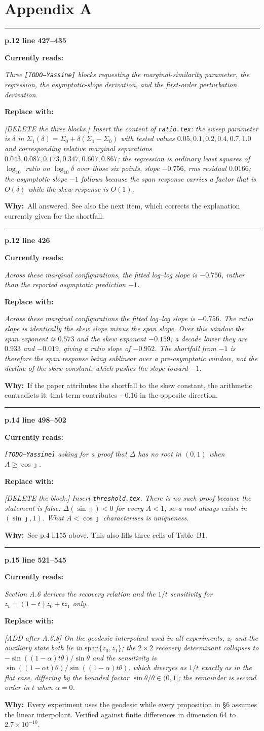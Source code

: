 \documentclass[11pt]{article}
\newcommand{\LOC}[2]{\medskip\noindent\textcolor{hd}{\rule{\textwidth}{0.6pt}}\par
  \noindent\textbf{\large p.#1 \quad line #2}\par\smallskip}
\newcommand{\WRONG}[1]{\noindent\textcolor{bad}{\textbf{Currently reads:}}\par
  \noindent\begingroup\itshape #1\endgroup\par\smallskip}
\newcommand{\RIGHT}[1]{\noindent\textcolor{good}{\textbf{Replace with:}}\par
  \noindent\begingroup\itshape #1\endgroup\par\smallskip}
\newcommand{\WHY}[1]{\noindent\textbf{Why:}\ #1\par}
\begin{document}
\section*{Appendix A}

\LOC{12}{427--435}
\WRONG{Three \texttt{[TODO---Yassine]} blocks requesting the marginal-similarity parameter, the
regression, the asymptotic-slope derivation, and the first-order perturbation derivation.}
\RIGHT{[DELETE the three blocks.] Insert the content of \texttt{ratio.tex}: the sweep parameter
is $\delta$ in $\Sigma_1(\delta)=\Sigma_0+\delta(\Sigma_1-\Sigma_0)$ with tested values
$0.05, 0.1, 0.2, 0.4, 0.7, 1.0$ and corresponding relative marginal separations
$0.043, 0.087, 0.173, 0.347, 0.607, 0.867$; the regression is ordinary least squares of
$\log_{10}$ ratio on $\log_{10}\delta$ over those six points, slope $-0.756$, rms residual
$0.0166$; the asymptotic slope $-1$ follows because the span response carries a factor that is
$O(\delta)$ while the skew response is $O(1)$.}
\WHY{All answered. See also the next item, which corrects the explanation currently given for the
shortfall.}

\LOC{12}{426}
\WRONG{Across these marginal configurations, the fitted log--log slope is $-0.756$, rather than
the reported asymptotic prediction $-1$.}
\RIGHT{Across these marginal configurations the fitted log--log slope is $-0.756$. The ratio
slope is identically the skew slope minus the span slope. Over this window the span exponent is
$0.573$ and the skew exponent $-0.159$; a decade lower they are $0.933$ and $-0.019$, giving a
ratio slope of $-0.952$. The shortfall from $-1$ is therefore the span response being sublinear
over a pre-asymptotic window, not the decline of the skew constant, which pushes the slope
\emph{toward} $-1$.}
\WHY{If the paper attributes the shortfall to the skew constant, the arithmetic contradicts it:
that term contributes $-0.16$ in the opposite direction.}

\LOC{14}{498--502}
\WRONG{\texttt{[TODO---Yassine]} asking for a proof that $\Delta$ has no root in $(0,1)$ when
$A\ge\cos\jmath$.}
\RIGHT{[DELETE the block.] Insert \texttt{threshold.tex}. There is no such proof because the
statement is false: $\Delta(\sin\jmath)<0$ for every $A<1$, so a root always exists in
$(\sin\jmath,1)$. What $A<\cos\jmath$ characterises is uniqueness.}
\WHY{See p.4 l.155 above. This also fills three cells of Table~B1.}

\LOC{15}{521--545}
\WRONG{Section A.6 derives the recovery relation and the $1/t$ sensitivity for
$z_t=(1-t)z_0+tz_1$ only.}
\RIGHT{[ADD after A.6.8] On the geodesic interpolant used in all experiments, $z_t$ and the
auxiliary state both lie in $\mathrm{span}\{z_0,z_1\}$; the $2\times2$ recovery determinant
collapses to $-\sin((1-\alpha)t\theta)/\sin\theta$ and the sensitivity is
$\sin((1-\alpha t)\theta)/\sin((1-\alpha)t\theta)$, which diverges as $1/t$ exactly as in the
flat case, differing by the bounded factor $\sin\theta/\theta\in(0,1]$; the remainder is second
order in $t$ when $\alpha=0$.}
\WHY{Every experiment uses the geodesic while every proposition in \S6 assumes the linear
interpolant. Verified against finite differences in dimension 64 to $2.7\times10^{-10}$.}
\end{document}
